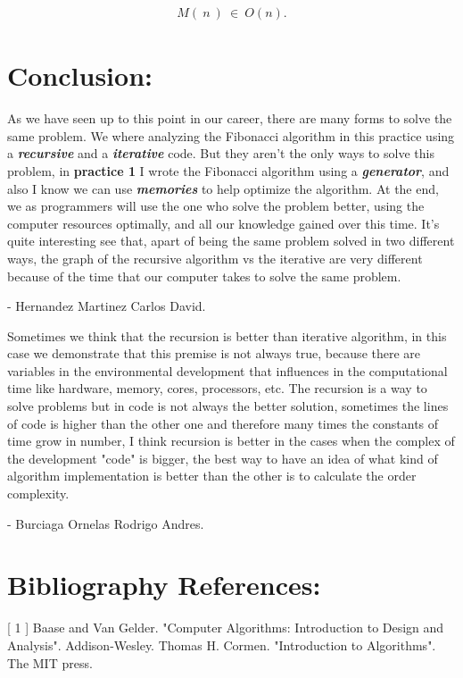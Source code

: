 \documentclass[10pt,a4paper]{article}
\begin{document}
{\bfseries\itshape\color{CadetBlue}{Finally:}}

\begin{ceqn}
\begin{align}
M(\ n\ )\ \in\ O(n).
\end{align}
\end{ceqn}

\pagebreak

\section{Conclusion:}

As we have seen up to this point in our career, there are many forms to solve the same problem. We where analyzing the Fibonacci algorithm in this practice using a {\bfseries\itshape recursive} and a {\bfseries\itshape iterative} code. But they aren't the only ways to solve this problem, in {\bfseries practice 1} I wrote the Fibonacci algorithm using a {\bfseries\itshape generator}, and also I know we can use {\bfseries\itshape memories} to help optimize the algorithm. At the end, we as programmers will use the one who solve the problem better, using the computer resources optimally, and all our knowledge gained over this time. It's quite interesting see that, apart of being the same problem solved in two different ways, the graph of the recursive algorithm vs the iterative are very different because of the time that our computer takes to solve the same problem.

\begin{flushright}
- Hernandez Martinez Carlos David.
\end{flushright} \hfill

Sometimes we think that the recursion is better than iterative algorithm, in this case we demonstrate that this premise is not always true, because there are variables in the environmental development that influences in the computational time like hardware, memory, cores, processors, etc. The recursion is a way to solve problems but in code is not  always the better solution, sometimes the  lines of code is higher than the other one and therefore many times the constants of time grow in number, I think recursion is better in the cases when the complex of the development "code" is bigger, the best way to have an idea of what kind of algorithm implementation is better than the other is to calculate the order complexity.

\begin{flushright}
- Burciaga Ornelas Rodrigo Andres.
\end{flushright}

\pagebreak

\section{Bibliography References:}

[ 1 ] Baase and Van Gelder. "Computer Algorithms: Introduction to Design and Analysis". Addison-Wesley. \hfill \break \break
[ 2 ] Thomas H. Cormen. "Introduction to Algorithms". The MIT press.
\end{document}

